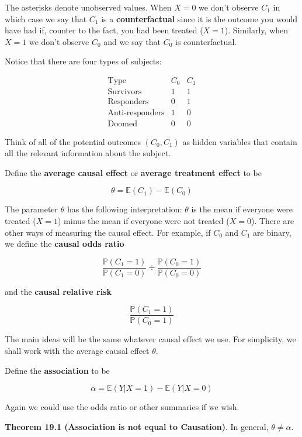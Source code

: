 The asterisks denote unobserved values. When \(X = 0\) we don't observe
\(C_1\) in which case we say that \(C_1\) is a \textbf{counterfactual}
since it is the outcome you would have had if, counter to the fact, you
had been treated (\(X = 1\)). Similarly, when \(X = 1\) we don't observe
\(C_0\) and we say that \(C_0\) is counterfactual.

Notice that there are four types of subjects:

\[
\begin{array}{lcc}
\text{Type} & C_0 & C_1 \\
\hline
\text{Survivors}       & 1 & 1 \\
\text{Responders}      & 0 & 1 \\
\text{Anti-responders} & 1 & 0 \\
\text{Doomed}          & 0 & 0
\end{array}
\]

Think of all of the potential outcomes \((C_0, C_1)\) as hidden
variables that contain all the relevant information about the subject.

Define the \textbf{average causal effect} or \textbf{average treatment
effect} to be

\[ \theta = \mathbb{E}(C_1) - \mathbb{E}(C_0) \]

The parameter \(\theta\) has the following interpretation: \(\theta\) is
the mean if everyone were treated (\(X = 1\)) minus the mean if everyone
were not treated (\(X = 0\)). There are other ways of measuring the
causal effect. For example, if \(C_0\) and \(C_1\) are binary, we define
the \textbf{causal odds ratio}

\[ \frac{\mathbb{P}(C_1 = 1)}{\mathbb{P}(C_1 = 0)} \div \frac{\mathbb{P}(C_0 = 1)}{\mathbb{P}(C_0 = 0)}\]

and the \textbf{causal relative risk}

\[ \frac{\mathbb{P}(C_1 = 1)}{\mathbb{P}(C_0 = 1)} \]

The main ideas will be the same whatever causal effect we use. For
simplicity, we shall work with the average causal effect \(\theta\).

Define the \textbf{association} to be

\[ \alpha = \mathbb{E}(Y | X = 1) - \mathbb{E}(Y | X = 0)\]

Again we could use the odds ratio or other summaries if we wish.

\textbf{Theorem 19.1 (Association is not equal to Causation)}. In
general, \(\theta \neq \alpha\).

